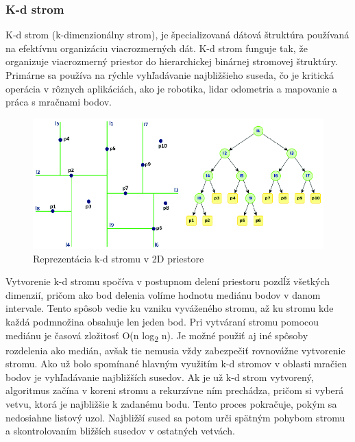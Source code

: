 \subsubsection{K-d strom}
\noindent K-d strom (k-dimenzionálny strom), je špecializovaná dátová štruktúra používaná na efektívnu organizáciu viacrozmerných dát. K-d strom funguje tak, že organizuje viacrozmerný priestor do hierarchickej binárnej stromovej štruktúry. Primárne sa používa na rýchle vyhľadávanie najbližšieho suseda, čo je kritická operácia v rôznych aplikáciách, ako je robotika, \acrshort{lidar} odometria a mapovanie a práca s mračnami bodov. \cite{kd_tree_new} \cite{kd_tree_old} 
\newline\begin{figure}[!htbp]
  \centering
  \includegraphics[width=14cm]{img/kd-tree.png}
  \caption{Reprezentácia k-d stromu v 2D priestore \cite{kd_tree}}
  \label{vzhladobr}
\end{figure}
\newline\indent Vytvorenie k-d stromu spočíva v postupnom delení priestoru pozdĺž všetkých dimenzií, pričom ako bod delenia volíme hodnotu mediánu bodov v danom intervale. Tento spôsob vedie ku vzniku vyváženého stromu, až ku stromu kde každá podmnožina obsahuje len jeden bod. Pri vytváraní stromu pomocou mediánu je časová zložitosť O(n log\textsubscript{2} n). Je možné použiť aj iné spôsoby rozdelenia ako medián, avšak tie nemusia vždy zabezpečiť rovnovážne vytvorenie stromu. \cite{kd_tree_old} 
\newline\indent Ako už bolo spomínané hlavným využitím k-d stromov v oblasti mračien bodov je vyhľadávanie najbližších susedov. Ak je už k-d strom vytvorený, algoritmus začína v koreni stromu a rekurzívne ním prechádza, pričom si vyberá vetvu, ktorá je najbližšie k zadanému bodu. Tento proces pokračuje, pokým sa nedosiahne listový uzol. Najbližší sused sa potom urči spätným pohybom stromu a skontrolovaním bližších susedov v ostatných vetvách. \cite{kd_tree_old}

